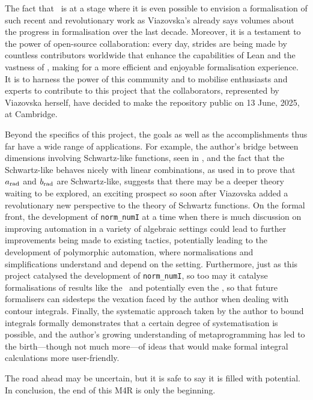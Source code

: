 
The fact that \mathlib\ is at a stage where it is even possible to envision a formalisation of such recent and revolutionary work as Viazovska's already says volumes about the progress in formalisation over the last decade. Moreover, it is a testament to the power of open-source collaboration: every day, strides are being made by countless contributors worldwide that enhance the capabilities of Lean and the vastness of \mathlib, making for a more efficient and enjoyable formalisation experience. It is to harness the power of this community and to mobilise enthusiasts and experts to contribute to this project that the collaborators, represented by Viazovska herself, have decided to make the repository public on 13 June, 2025, at Cambridge.

Beyond the specifics of this project, the goals as well as the accomplishments thus far have a wide range of applications. For example, the author's bridge between dimensions involving Schwartz-like functions, seen in , and the fact that the Schwartz-like behaves nicely with linear combinations, as used in  to prove that $a_{\operatorname{rad}}$ and $b_{\operatorname{rad}}$ are Schwartz-like, suggests that there may be a deeper theory waiting to be explored, an exciting prospect so soon after Viazovska added a revolutionary new perspective to the theory of Schwartz functions. On the formal front, the development of \lstinline|norm_numI| at a time when there is much discussion on improving automation in a variety of algebraic settings could lead to further improvements being made to existing tactics, potentially leading to the development of polymorphic automation, where normalisations and simplifications understand and depend on the setting. Furthermore, just as this project catalysed the development of \lstinline|norm_numI|, so too may it catalyse formalisations of results like the \CGT\ and potentially even the \JCT, so that future formalisers can sidesteps the vexation faced by the author when dealing with contour integrals. Finally, the systematic approach taken by the author to bound integrals formally demonstrates that a certain degree of systematisation is possible, and the author's growing understanding of metaprogramming has led to the birth---though not much more---of ideas that would make formal integral calculations more user-friendly.

The road ahead may be uncertain, but it is safe to say it is filled with potential. In conclusion, the end of this M4R is only the beginning.